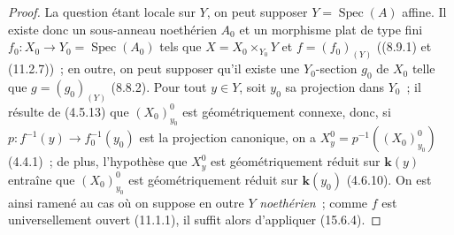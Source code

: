 \begin{proof}
La question étant locale sur $Y$, on peut supposer $Y=\operatorname{Spec}(A)$ affine. Il existe donc un sous-anneau noethérien $A_0$ et un morphisme plat de type fini $f_0:X_0\to Y_0=\operatorname{Spec}(A_0)$ tels que $X=X_0\times_{Y_0}Y$ et $f=(f_0)_{(Y)}$ ((8.9.1) et (11.2.7))~; en outre, on peut supposer qu'il existe une $Y_0$-section $g_0$ de $X_0$ telle que $g=(g_0)_{(Y)}$ (8.8.2). Pour tout $y\in Y$, soit $y_0$ sa projection dans $Y_0$~; il résulte de (4.5.13) que $(X_0)_{y_0}^0$ est géométriquement connexe, donc, si $p:f^{-1}(y)\to f_0^{-1}(y_0)$ est la projection canonique, on a $X_y^0=p^{-1}((X_0)_{y_0}^0)$ (4.4.1)~; de plus, l'hypothèse que $X_y^0$ est géométriquement réduit sur $\boldsymbol{k}(y)$ entraîne que $(X_0)_{y_0}^0$ est géométriquement réduit sur $\boldsymbol{k}(y_0)$ (4.6.10). On est ainsi ramené au cas où on suppose
en outre $Y$ \emph{noethérien}~; comme $f$ est universellement ouvert (11.1.1), il suffit alors d'appliquer (15.6.4).
\end{proof}

